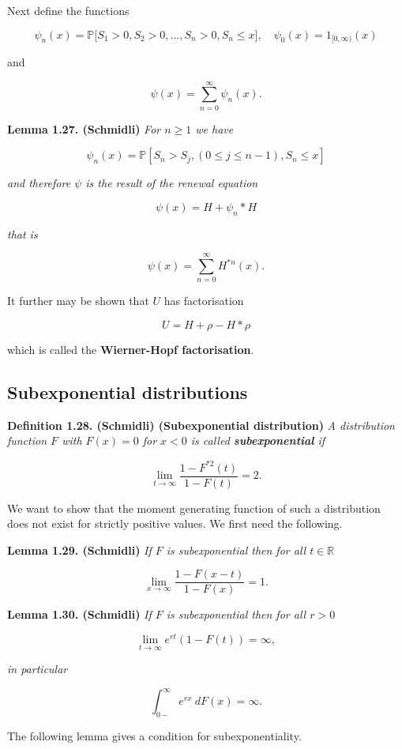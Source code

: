 \documentclass[a4paper,10pt,openany]{book}
\begin{document}
Next define the functions

\[
\psi_n(x)=\mathbb P\Big[S_1>0,S_2>0,...,S_n>0,S_n\le x\Big],\quad \psi_0(x)=1_{[0,\infty)}(x)
\]

and

\[
\psi(x)=\sum_{n=0}^\infty \psi_n(x).
\]

\textbf{Lemma 1.27. (Schmidli)} \emph{For \(n\ge 1\) we have}

\[
\psi_n(x)=\mathbb P[S_n>S_j, (0\le j\le n-1),S_n\le x]
\]

\emph{and therefore \(\psi\) is the result of the renewal equation}

\[
\psi(x)=H + \psi_n* H
\]

\emph{that is}

\[
\psi(x)=\sum_{n=0}^\infty H^{*n}(x).
\]

It further may be shown that \(U\) has factorisation

\[
U=H+\rho-H * \rho
\]

which is called the \textbf{Wierner-Hopf factorisation}.

\hypertarget{subexponential-distributions}{%
\subsection{Subexponential distributions}\label{subexponential-distributions}}

\textbf{Definition 1.28. (Schmidli) (Subexponential distribution)} \emph{A distribution function \(F\) with \(F(x)=0\) for \(x<0\) is called \textbf{subexponential} if}

\[
\lim_{t\to\infty}\frac{1-F^{*2}(t)}{1-F(t)}=2.
\]

We want to show that the moment generating function of such a distribution does not exist for strictly positive values. We first need the following.

\textbf{Lemma 1.29. (Schmidli)} \emph{If \(F\) is subexponential then for all \(t\in\mathbb R\)}

\[
\lim_{x\to\infty}\frac{1-F(x-t)}{1-F(x)}=1.
\]

\textbf{Lemma 1.30. (Schmidli)} \emph{If \(F\) is subexponential then for all \(r>0\)}

\[
\lim_{t\to\infty}e^{rt}(1-F(t))=\infty,
\]

\emph{in particular}

\[
\int_{0-}^\infty e^{rx}\ dF(x)=\infty.
\]

The following lemma gives a condition for subexponentiality.
\end{document}
